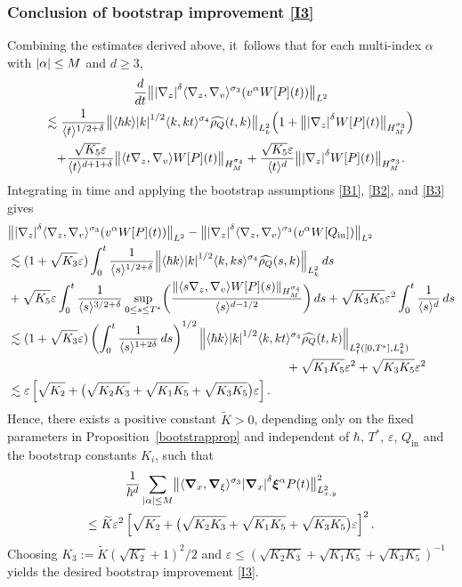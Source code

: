 \documentclass[JEP,XML,SOM,Unicode]{cedram}
\newcommand{\bnorm}[1]{\bigl\|#1\bigr\|}
\theoremstyle{plain}
\theoremstyle{remark}
\newcommand{\br}[1]{\left(#1\right)}
\newcommand{\bbr}[1]{\bigl(#1 \bigr)}
\newcommand{\Bbr}[1]{\Bigl(#1 \Bigr)}
\newcommand{\bbbr}[1]{\biggl(#1 \biggr)}
\newcommand{\aal}{\abs{\alpha}}
\newcommand{\sbr}[1]{\left[#1\right]}
\newcommand{\jb}[1]{\langle#1\rangle}
\newcommand{\ep}{\varepsilon}
\newcommand{\Qin}{Q_{\mathrm{in}}}
\begin{document}
\subsubsection*{Conclusion of bootstrap improvement \eqref{I3}}
Combining the estimates derived above, it~follows that for each multi-index $\alpha$ with $\aal\leq M$ and $d\geq 3$,
\begin{multline*}
\frac{d}{dt}\bnorm{\abs{\nabla_z}^\delta\jb{\nabla_z,\nabla_v}^{\sigma_3}(v^\alpha W[P](t))}_{L^2}\\
\lesssim\frac{1}{\jb{t}^{1/2+\delta}}\bnorm{\jb{\hbar k}\abs{k}^{1/2}\jb{k,kt}^{\sigma_4} \widehat{\rho_Q}(t,k)}_{L^2_k}\Bbr{1+\bnorm{\abs{\nabla_z}^\delta W[P](t)}_{H^{\sigma_3}_M}}\\
+\frac{\sqrt{K_5}\ep}{\jb{t}^{d+1+\delta}}\bnorm{\jb{t\nabla_z,\nabla_v}W[P](t)}_{H^{\sigma_4}_M}+\frac{\sqrt{K_5}\ep}{\jb{t}^d}\bnorm{\abs{\nabla_z}^\delta W[P](t)}_{H^{\sigma_3}_M}.
\end{multline*}
Integrating in time and applying the bootstrap assumptions \eqref{B1}, \eqref{B2}, and \eqref{B3} gives
\begin{align*}
&\bnorm{\abs{\nabla_z}^\delta\jb{\nabla_z,\nabla_v}^{\sigma_3}(v^\alpha W[P](t))}_{L^2}-\bnorm{\abs{\nabla_z}^\delta\jb{\nabla_z,\nabla_v}^{\sigma_3}(v^\alpha W[\Qin])}_{L^2}\\
&\lesssim(1+\sqrt{K_3}\ep)\int_0^t\frac{1}{\jb{s}^{{1/2}+\delta}}\norm{\jb{\hbar k}\abs{k}^{1/2}\jb{k,ks}^{\sigma_4} \widehat{\rho_Q}(s,k)}_{L^2_k}\,ds\\
&+\sqrt{K_5}\ep\int_0^t\frac{1}{\jb{s}^{3/2+\delta}}\sup_{0\leq s\leq T^*}\bbbr{\frac{\norm{\jb{s\nabla_z,\nabla_v}W[P](s)}_{H^{\sigma_4}_M}}{\jb{s}^{d-1/2}}}\,ds+\sqrt{K_3K_5}\ep^2\int_0^t\frac{1}{\jb{s}^d}\,ds\\
&\lesssim(1+\sqrt{K_3}\ep)\br{\int_0^t\frac{1}{\jb{s}^{1+2\delta}}\,ds}^{1/2}\norm{\jb{\hbar k}\abs{k}^{1/2}\jb{k,kt}^{\sigma_4} \widehat{\rho_Q}(t,k)}_{L^2_{t}([0,T^*],L^2_k)}\\
&\hspace{8cm}+\sqrt{K_1K_5}\ep^2+\sqrt{K_3K_5}\ep^2\\
&\lesssim\ep\sbr{\sqrt{K_2}+\bbr{\sqrt{K_2K_3}+\sqrt{K_1K_5}+\sqrt{K_3K_5}}\ep}.
\end{align*}
Hence, there exists a positive constant $\widetilde K>0$, depending only on the fixed parameters in Proposition~\ref{bootstrapprop} and independent of $\hbar$, $T^*$, $\ep$, $\Qin$ and the bootstrap constants $K_i$, such that
\begin{multline*}
\frac{1}{\hbar^d}\sum_{\aal\leq M}\bnorm{\jb{\bm{\nabla}_x,\bm{\nabla}_\xi}^{\sigma_3}\abs{\bm{\nabla}_x}^\delta \bm{\xi}^\alpha P(t)}_{L^2_{x,y}}^2\\
\leq \widetilde K\ep^2\sbr{\sqrt{K_2}+\bbr{\sqrt{K_2K_3}+\sqrt{K_1K_5}+\sqrt{K_3K_5}}\ep}^2.
\end{multline*}
Choosing $K_3 := \widetilde K (\sqrt{K_2} + 1)^2 / 2$ and $\ep \leq (\sqrt{K_2 K_3} + \sqrt{K_1 K_5} + \sqrt{K_3 K_5})^{-1}$ yields the desired bootstrap improvement \eqref{I3}.
\end{document}
